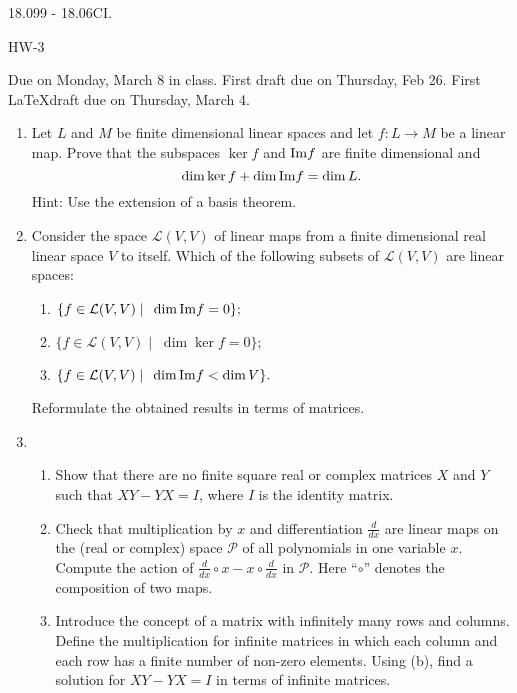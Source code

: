 \documentclass[11pt]{amsart}
\begin{document}
\thispagestyle{empty}

{\Large  18.099 - 18.06CI.} 

\vspace{1cm} 
{\large HW-3} 
 

{Due on Monday, March 8 in class. 
First draft due on Thursday, Feb 26. First \LaTeX draft due 
on Thursday, March 4.}

\vspace{1cm}
 

\begin{enumerate}

\item{Let $L$ and $M$ be finite dimensional linear spaces and let 
$f: L \to M$ be a linear map. Prove that the subspaces $\ker f$ and 
${\rm Im }f$ are finite dimensional and 
$$ \dim \ker f + \dim {\rm Im}f = \dim L .$$ 
Hint: Use the extension of a basis theorem.}

\item{
Consider the space ${\mathcal L}(V,V)$ 
of linear maps 
from a finite 
dimensional real linear space $V$ to itself.
Which of the following subsets of 
${\mathcal L}(V,V)$ 
are linear spaces: 
\begin{enumerate} 
 \item{ $\{f \in {\mathcal L}(V,V) \; | \;\; \dim {\rm Im}f =0\};$ }
 \item{ $\{f \in {\mathcal L}(V,V) \; | \;\; \dim {\ker}f =0\};$ }
 \item{ $\{f \in {\mathcal L}(V,V) \; | \;\; \dim {\rm Im}f < \dim V\}.$} 
\end{enumerate} 
Reformulate the obtained results in terms of matrices.}

\item{\begin{enumerate} 
      \item{Show that there are no finite square real or complex matrices 
$X$ and $Y$ such that $XY -YX =I$, where $I$ is the 
identity matrix. }
      \item{Check that multiplication by $x$ and differentiation 
$\frac{d}{dx}$ are linear maps on the (real or complex) 
space $\mathcal P$ of all polynomials in one variable $x$. 
Compute the action of 
$\frac{d}{dx} \circ x - x \circ \frac{d}{dx}$ in $\mathcal P$. 
Here ``$\circ$'' denotes the composition of two maps. } 
      \item{Introduce the concept of a matrix with infinitely many  
rows and columns. Define the multiplication for infinite 
matrices in which each column and each row has a finite 
number of non-zero elements. Using (b), find a solution 
for $XY -YX =I$ in terms of infinite matrices.} 
\end{enumerate} }

\end{enumerate} 
\end{document}
